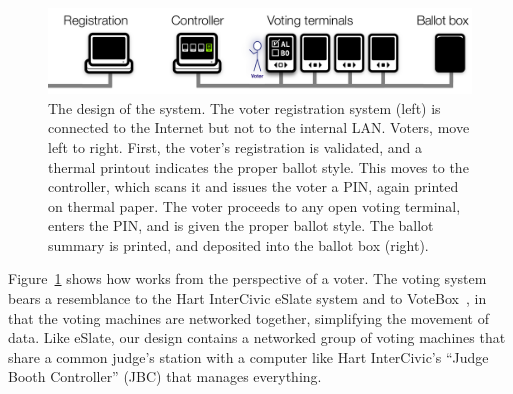 \label{sec:voterflow}

\begin{figure}
\includegraphics[width=5.5in]{system-layout}
\caption{The design of the \projname system. The voter registration
  system (left) is connected to the Internet but not to the internal
  LAN. Voters, move left to right. First, the voter's registration
  is validated, and a thermal printout indicates the proper ballot
  style. This moves to the controller, which scans it and issues the
  voter a PIN, again printed on thermal
  paper. The voter proceeds to any open voting terminal, enters the
  PIN, and is given the proper ballot style. The ballot summary is
  printed, and deposited into the ballot box
  (right). \label{fig:design}}

\end{figure}

Figure~\ref{fig:design} shows how \projname works from the perspective
of a voter. 
The \projname voting system bears a resemblance to the Hart InterCivic eSlate system and to VoteBox~\cite{sandler08votebox}, in that the voting machines are networked together, 
simplifying the movement of data. 
Like eSlate, our design contains a networked group of voting machines that share a common judge's station with a computer like Hart InterCivic's ``Judge Booth Controller'' (JBC) that manages everything. 

